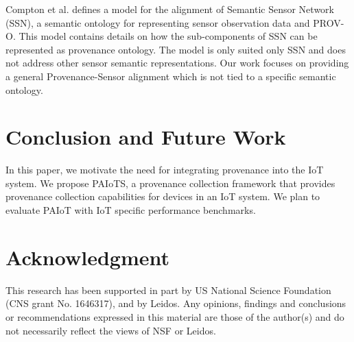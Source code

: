 \documentclass[conference]{IEEEtran}
\begin{document}
\par Compton et al.\cite{compton2014sensor} defines a model for the alignment of Semantic Sensor Network (SSN), a semantic ontology for representing sensor observation data and PROV-O. This model contains details on how the sub-components of SSN can be represented as provenance ontology. The model is only suited only SSN and does not address other sensor semantic representations. Our work focuses on providing a general Provenance-Sensor alignment which is not tied to a specific semantic ontology.

\section{Conclusion and Future Work}
In this paper, we motivate the need for integrating provenance into the IoT system. 
We propose PAIoTS, a provenance collection framework that provides provenance collection capabilities for devices in an IoT system. We plan to evaluate PAIoT with IoT specific performance benchmarks. 




%
%
%






\section*{Acknowledgment}

This research has been supported in part by US National Science Foundation
 (CNS grant No. 1646317), and by Leidos. Any opinions, findings and conclusions or recommendations expressed in this material are those of the author(s) and do not necessarily reflect the views of NSF or Leidos.





\end{document}
